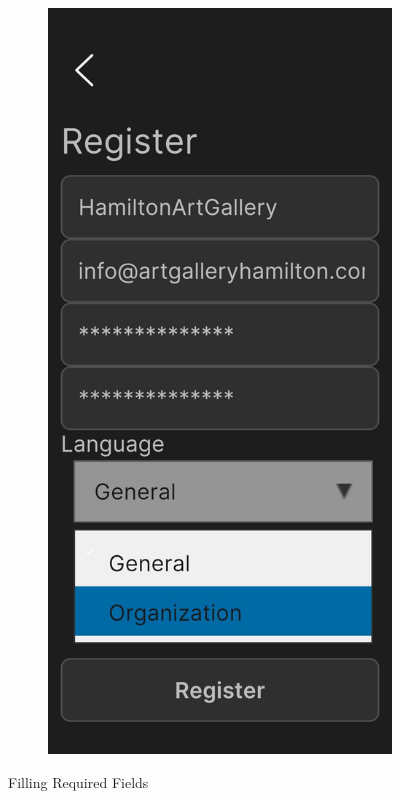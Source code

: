 \documentclass[12pt, titlepage]{article}
\begin{document}
\begin{figure}[ht!]
\begin{subfigure}[b]{0.48\textwidth}
    \end{subfigure}
    \hfill
    \begin{subfigure}[b]{0.48\textwidth}
        \centering
        \includegraphics[width=\textwidth]{register3.png}
    \end{subfigure}
    \caption{Filling Required Fields}
    \label{fig:setup2}
\end{figure}
\end{document}
